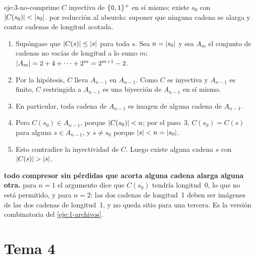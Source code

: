 \begin{solucion}{eje:3-no-comprime}
\datos $C$ inyectiva de $\{\textnormal{\texttt{0}},\textnormal{\texttt{1}}\}^{+}$ en sí mismo; existe $s_0$ con $\lvert C(s_0)\rvert<\lvert s_0\rvert$.
\planteamiento por reducción al absurdo: suponer que ninguna cadena se alarga y contar cadenas de longitud acotada.
\pasos
\begin{enumerate}[label=\arabic*.]
  \item Supóngase que $\lvert C(s)\rvert\le\lvert s\rvert$ para toda $s$. Sea $n=\lvert s_0\rvert$ y sea $A_m$ el conjunto de cadenas no vacías de longitud a lo sumo $m$; $\lvert A_m\rvert=2+4+\dots+2^{m}=2^{m+1}-2$.
  \item Por la hipótesis, $C$ lleva $A_{n-1}$ en $A_{n-1}$. Como $C$ es inyectiva y $A_{n-1}$ es finito, $C$ restringida a $A_{n-1}$ es una biyección de $A_{n-1}$ en sí mismo.
  \item En particular, toda cadena de $A_{n-1}$ es imagen de alguna cadena de $A_{n-1}$.
  \item Pero $C(s_0)\in A_{n-1}$, porque $\lvert C(s_0)\rvert<n$; por el paso~3, $C(s_0)=C(s)$ para alguna $s\in A_{n-1}$, y $s\ne s_0$ porque $\lvert s\rvert<n=\lvert s_0\rvert$.
  \item Esto contradice la inyectividad de $C$. Luego existe alguna cadena $s$ con $\lvert C(s)\rvert>\lvert s\rvert$.
\end{enumerate}
\resultado \textbf{todo compresor sin pérdidas que acorta alguna cadena alarga alguna otra.}
\comprobacion para $n=1$ el argumento dice que $C(s_0)$ tendría longitud~0, lo que no está permitido, y para $n=2$: las dos cadenas de longitud~1 deben ser imágenes de las dos cadenas de longitud~1, y no queda sitio para una tercera. Es la versión combinatoria del \cref{eje:1-archivos}.
\end{solucion}

\section{Tema 4}

